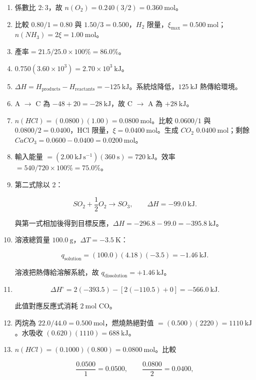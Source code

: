 \documentclass[11pt,a4paper]{article}
\begin{document}
\begin{enumerate}
\def\labelenumi{\arabic{enumi}.}
\item
  係數比 \(2:3\)，故 \(n(O_2)=0.240(3/2)=0.360\ \mathrm{mol}\)。
\item
  比較 \(0.80/1=0.80\) 與 \(1.50/3=0.500\)，\(H_2\) 限量，\(\xi_{\max}=0.500\ \mathrm{mol}\)；\(n(NH_3)=2\xi=1.00\ \mathrm{mol}\)。
\item
  \(\text{產率}=21.5/25.0\times100\%=86.0\%\)。
\item
  \(0.750(3.60\times10^3)=2.70\times10^3\ \mathrm{kJ}\)。
\item
  \(\Delta H=H_{\text{products}}-H_{\text{reactants}}=-125\ \mathrm{kJ}\)。系統焓降低，\(125\ \mathrm{kJ}\) 熱傳給環境。
\item
  A \(\rightarrow\) C 為 \(-48+20=-28\ \mathrm{kJ}\)，故 C \(\rightarrow\) A 為 \(+28\ \mathrm{kJ}\)。
\item
  \(n(HCl)=(0.0800)(1.00)=0.0800\ \mathrm{mol}\)。比較 \(0.0600/1\) 與 \(0.0800/2=0.0400\)，HCl 限量，\(\xi=0.0400\ \mathrm{mol}\)。生成 \(CO_2\) \(0.0400\ \mathrm{mol}\)；剩餘 \(CaCO_3=0.0600-0.0400=0.0200\ \mathrm{mol}\)。
\item
  輸入能量 \(=(2.00\ \mathrm{kJ\,s^{-1}})(360\ \mathrm s)=720\ \mathrm{kJ}\)。效率 \(=540/720\times100\%=75.0\%\)。
\item
  第二式除以 2：

  \[
  SO_2+\frac12O_2\rightarrow SO_3,\qquad \Delta H=-99.0\ \mathrm{kJ}.
  \]

  與第一式相加後得到目標反應，\(\Delta H=-296.8-99.0=-395.8\ \mathrm{kJ}\)。
\item
  溶液總質量 \(100.0\ \mathrm g\)，\(\Delta T=-3.5\ \mathrm K\)：

  \[
  q_{\text{solution}}=(100.0)(4.18)(-3.5)=-1.46\ \mathrm{kJ}.
  \]

  溶液把熱傳給溶解系統，故 \(q_{\text{dissolution}}=+1.46\ \mathrm{kJ}\)。
\item
  \[
   \Delta H^\circ=2(-393.5)-[2(-110.5)+0]=-566.0\ \mathrm{kJ}.
   \]

  此值對應反應式消耗 \(2\ \mathrm{mol}\) CO。
\item
  丙烷為 \(22.0/44.0=0.500\ \mathrm{mol}\)，燃燒熱絕對值 \(=(0.500)(2220)=1110\ \mathrm{kJ}\)。水吸收 \((0.620)(1110)=688\ \mathrm{kJ}\)。
\item
  \(n(HCl)=(0.1000)(0.800)=0.0800\ \mathrm{mol}\)。比較

  \[
  \frac{0.0500}{1}=0.0500,\qquad
  \frac{0.0800}{2}=0.0400,
  \]


\end{enumerate}
\end{document}
